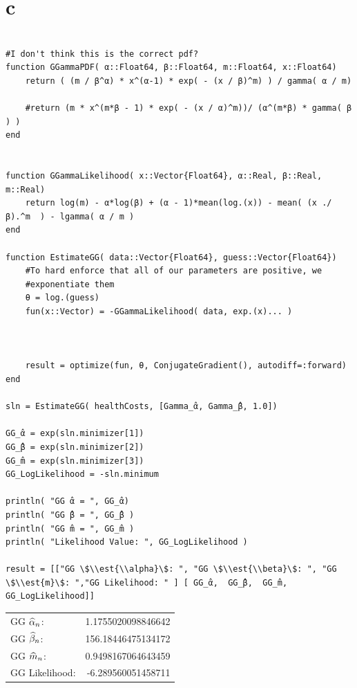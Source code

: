 \documentclass[12pt, letterpaper]{paper}
\begin{document}
\section{c}
\label{sec:orga90bcb5}
\begin{verbatim}

#I don't think this is the correct pdf?
function GGammaPDF( α::Float64, β::Float64, m::Float64, x::Float64)
    return ( (m / β^α) * x^(α-1) * exp( - (x / β)^m) ) / gamma( α / m)

    #return (m * x^(m*β - 1) * exp( - (x / α)^m))/ (α^(m*β) * gamma( β ) )
end


function GGammaLikelihood( x::Vector{Float64}, α::Real, β::Real, m::Real)
    return log(m) - α*log(β) + (α - 1)*mean(log.(x)) - mean( (x ./ β).^m  ) - lgamma( α / m )    
end

function EstimateGG( data::Vector{Float64}, guess::Vector{Float64})
    #To hard enforce that all of our parameters are positive, we
    #exponentiate them
    θ = log.(guess)
    fun(x::Vector) = -GGammaLikelihood( data, exp.(x)... )



    result = optimize(fun, θ, ConjugateGradient(), autodiff=:forward)
end

sln = EstimateGG( healthCosts, [Gamma_̂α, Gamma_̂β, 1.0])

GG_̂α = exp(sln.minimizer[1])
GG_̂β = exp(sln.minimizer[2])
GG_̂m = exp(sln.minimizer[3])
GG_LogLikelihood = -sln.minimum

println( "GG ̂α = ", GG_̂α)
println( "GG ̂β = ", GG_̂β )
println( "GG ̂m = ", GG_̂m )
println( "Likelihood Value: ", GG_LogLikelihood )

result = [["GG \$\\est{\\alpha}\$: ", "GG \$\\est{\\beta}\$: ", "GG \$\\est{m}\$: ","GG Likelihood: " ] [ GG_̂α,  GG_̂β,  GG_̂m, GG_LogLikelihood]]
\end{verbatim}

\begin{center}
\begin{tabular}{lr}
GG \(\widehat{ \alpha }_{n}\): & 1.1755020098846642\\
GG \(\widehat{ \beta }_{n}\): & 156.18446475134172\\
GG \(\widehat{ m }_{n}\): & 0.9498167064643459\\
GG Likelihood: & -6.289560051458711\\
\end{tabular}
\end{center}
\end{document}
